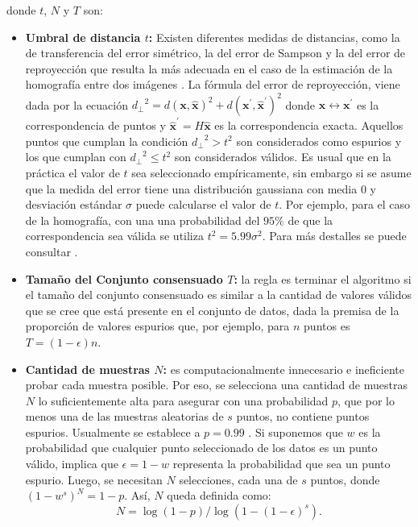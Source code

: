donde $t$, $N$ y $T$ son:
\begin{itemize}
  \item \textbf{Umbral de distancia $t$:} Existen diferentes medidas de distancias, como la de transferencia del error simétrico, la del error de Sampson y la del error de reproyección que resulta la más adecuada en el caso de la estimación de la homografía entre dos imágenes \cite{Hartley2004}. La fórmula del error de reproyección, viene dada por la ecuación ${d_{\perp}}^{2}=d(\mathbf{x},\mathbf{\hat{x}})^2+d(\mathbf{x^\prime},\mathbf{\hat{x}^\prime})^2$ donde $\mathbf{x} \leftrightarrow \mathbf{x^\prime}$ es la correspondencia de puntos y $\mathbf{\hat{x}^\prime}=\textit{H}\mathbf{\hat{x}}$ es la correspondencia exacta. Aquellos puntos que cumplan la condición ${d_{\perp}}^{2}>t^2$ son considerados como espurios y los que cumplan con ${d_{\perp}}^{2} \leq t^2$ son considerados válidos. Es usual que en la práctica el valor de $t$ sea seleccionado empíricamente, sin embargo si se asume que la medida del error tiene una distribución gaussiana con media 0 y desviación estándar $\sigma$ puede calcularse el valor de $t$. Por ejemplo, para el caso de la homografía, con una una probabilidad del $95\%$ de que la correspondencia sea válida se utiliza $t^2=5.99\sigma^2$. Para más destalles se puede consultar \cite[p. 119]{Hartley2004}.
  \item \textbf{Tamaño del Conjunto consensuado $T$:} la regla es terminar el algoritmo si el tamaño del conjunto consensuado es similar a la cantidad de valores válidos que se cree que está presente en el conjunto de datos, dada la premisa de la proporción de valores espurios que, por ejemplo, para $n$ puntos es $T=(1-\epsilon)n$.
  \item \textbf{Cantidad de muestras $N$:} es computacionalmente innecesario e ineficiente probar cada muestra posible. Por eso, se selecciona una cantidad de muestras $N$ lo suficientemente alta para asegurar con una probabilidad $p$, que por lo menos una de las muestras aleatorias de $s$ puntos, no contiene puntos espurios. Usualmente se establece a $p=0.99$ \cite{Hartley2004}. Si suponemos que $w$ es la probabilidad que cualquier punto seleccionado de los datos es un punto válido, implica que $\epsilon=1-w$ representa la probabilidad que sea un punto espurio. Luego, se necesitan $N$ selecciones, cada una de $s$ puntos, donde $(1-w^s)^{N}=1-p$. Así, $N$ queda definida como:
  \begin{equation}
    N=\log(1-p)/\log{(1-(1-\epsilon)^s)}.
    \label{eq:determineN}
  \end{equation}


\end{itemize}
